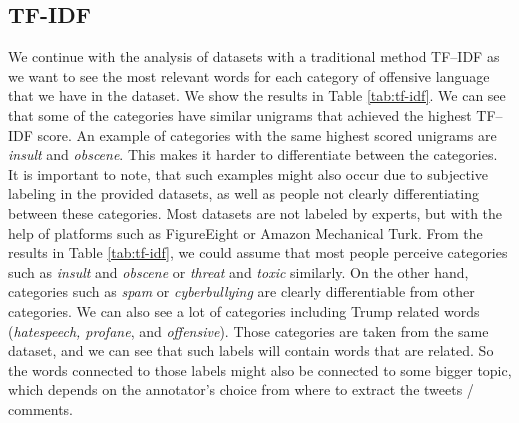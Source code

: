 \documentclass[fleqn,moreauthors,10pt]{ds_report}
\begin{document}
\subsection*{TF-IDF}
We continue with the analysis of datasets with a traditional method TF--IDF as we want to see the most relevant words for each category of offensive language that we have in the dataset. We show the results in Table \ref{tab:tf-idf}. We can see that some of the categories have similar unigrams that achieved the highest TF--IDF score. An example of categories with the same highest scored unigrams are \textit{insult} and \textit{obscene}. This makes it harder to differentiate between the categories. It is important to note, that such examples might also occur due to subjective labeling in the provided datasets, as well as people not clearly differentiating between these categories. Most datasets are not labeled by experts, but with the help of platforms such as FigureEight or Amazon Mechanical Turk. From the results in Table \ref{tab:tf-idf}, we could assume that most people perceive categories such as \textit{insult} and \textit{obscene} or \textit{threat} and \textit{toxic} similarly. On the other hand, categories such as \textit{spam} or \textit{cyberbullying} are clearly differentiable from other categories. We can also see a lot of categories including Trump related words (\textit{hatespeech, profane}, and \textit{offensive}). Those categories are taken from the same dataset, and we can see that such labels will contain words that are related. So the words connected to those labels might also be connected to some bigger topic, which depends on the annotator's choice from where to extract the tweets / comments.
\end{document}
